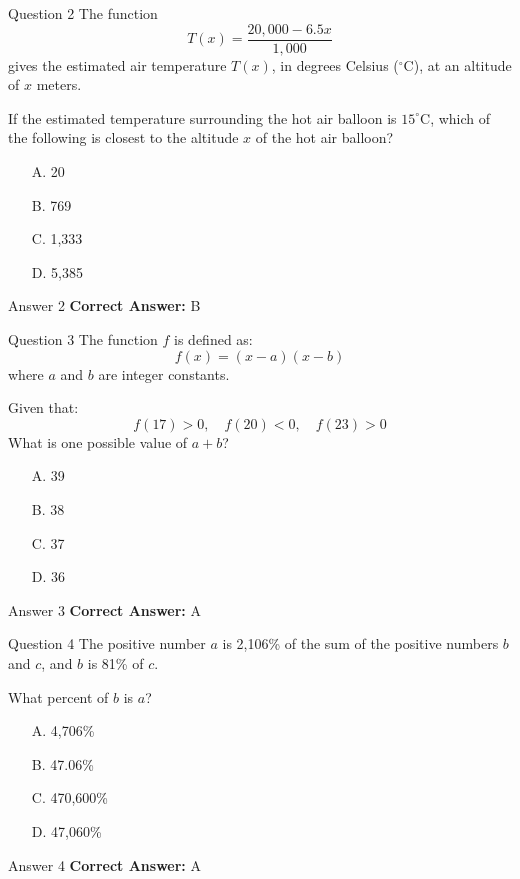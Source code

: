 \documentclass{beamer}
\begin{document}
\begin{frame}{Question 2}
\small
The function
\[
T(x) = \frac{20{,}000 - 6.5x}{1{,}000}
\]
gives the estimated air temperature \(T(x)\), in degrees Celsius (\(^\circ\text{C}\)), at an altitude of \(x\) meters.

If the estimated temperature surrounding the hot air balloon is \(15^\circ\text{C}\), which of the following is closest to the altitude \(x\) of the hot air balloon?
\vspace{0.35cm}
\begin{enumerate}
    \item[A.] 20
    \item[B.] 769
    \item[C.] 1,333
    \item[D.] 5,385
\end{enumerate}
\end{frame}
\begin{frame}{Answer 2}
\small
\textbf{Correct Answer:} B
\end{frame}

\begin{frame}{Question 3}
\small
The function \(f\) is defined as:
\[
f(x) = (x - a)(x - b)
\]
where \(a\) and \(b\) are integer constants.

Given that:
\[
f(17) > 0,\quad f(20) < 0,\quad f(23) > 0
\]
What is one possible value of \(a + b\)?
\vspace{0.35cm}
\begin{enumerate}
    \item[A.] 39
    \item[B.] 38
    \item[C.] 37
    \item[D.] 36
\end{enumerate}
\end{frame}
\begin{frame}{Answer 3}
\small
\textbf{Correct Answer:} A
\end{frame}

\begin{frame}{Question 4}
\small
The positive number \(a\) is 2,106\% of the sum of the positive numbers \(b\) and \(c\), and \(b\) is 81\% of \(c\).

What percent of \(b\) is \(a\)?
\vspace{0.35cm}
\begin{enumerate}
    \item[A.] 4,706\%
    \item[B.] 47.06\%
    \item[C.] 470,600\%
    \item[D.] 47,060\%
\end{enumerate}
\end{frame}
\begin{frame}{Answer 4}
\small
\textbf{Correct Answer:} A
\end{frame}
\end{document}
